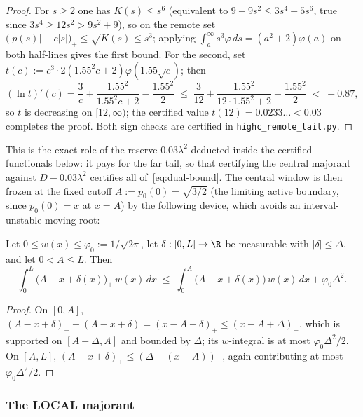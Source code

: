 \begin{proof}
For $s\ge2$ one has $K(s)\le s^6$ (equivalent to $9+9s^2\le3s^4+5s^6$, true since $3s^4\ge12s^2>9s^2+9$), so on the remote set $\bigl(|p(s)|-c|s|\bigr)_+\le\sqrt{K(s)}\le s^3$; applying $\int_a^\infty s^3\varphi\,ds=(a^2+2)\varphi(a)$ on both half-lines gives the first bound. For the second, set $t(c):=c^3\cdot2(1.55^2c+2)\varphi(1.55\sqrt c)$; then
\[
        (\ln t)'(c)=\frac3c+\frac{1.55^2}{1.55^2c+2}-\frac{1.55^2}2
        \;\le\;\frac3{12}+\frac{1.55^2}{12\cdot1.55^2+2}-\frac{1.55^2}2\;<\;-0.87,
\]
so $t$ is decreasing on $[12,\infty)$; the certified value $t(12)=0.0233\ldots<0.03$ completes the proof. Both sign checks are certified in \texttt{highc\_remote\_tail.py}.
\end{proof}

This is the exact role of the reserve $0.03\lambda^2$ deducted inside the certified functionals below: it pays for the far tail, so that certifying the central majorant against $D-0.03\lambda^2$ certifies all of~\eqref{eq:dual-bound}. The central window is then frozen at the fixed cutoff $A:=p_0(0)=\sqrt{3/2}$ (the limiting active boundary, since $p_0(0)=x$ at $x=A$) by the following device, which avoids an interval-unstable moving root:

\begin{lemma}\label{lem:moving-cutoff}
Let $0\le w(x)\le\varphi_0:=1/\sqrt{2\pi}$, let $\delta:[0,L]\to\R$ be measurable with $|\delta|\le\Delta$, and let $0<A\le L$. Then
\[
        \int_0^L\bigl(A-x+\delta(x)\bigr)_+\,w(x)\,dx
        \;\le\;
        \int_0^A\bigl(A-x+\delta(x)\bigr)\,w(x)\,dx+\varphi_0\Delta^2 .
\]
\end{lemma}

\begin{proof}
On $[0,A]$, $(A-x+\delta)_+-(A-x+\delta)=(x-A-\delta)_+\le(x-A+\Delta)_+$, which is supported on $[A-\Delta,A]$ and bounded by $\Delta$; its $w$-integral is at most $\varphi_0\Delta^2/2$. On $[A,L]$, $(A-x+\delta)_+\le(\Delta-(x-A))_+$, again contributing at most $\varphi_0\Delta^2/2$.
\end{proof}

\subsubsection*{The LOCAL majorant}

